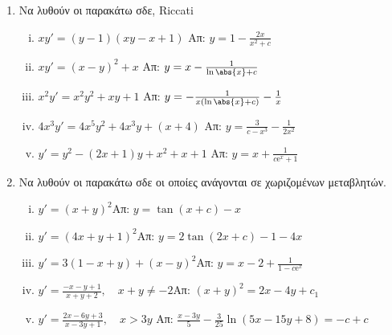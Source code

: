 \begin{enumerate}
  \item Να λυθούν οι παρακάτω σδε, Riccati
    \begin{enumerate}[i)]
      \item $xy'=(y-1)(xy-x+1)$ \hfill Απ: $y=1-\frac{2x}{x^2+c}$
      \item $xy'=(x-y)^2+x$ \hfill Απ: $y=x-\frac{1}{\ln\abs{x}+c}$
      \item $x^2y'=x^2y^2+xy+1$ \hfill Απ: $y=-\frac{1}{x(\ln\abs{x}+c)}-\frac{1}{x}$
      \item $4x^3y'=4x^5y^2+4x^3y+(x+4)$ \hfill Απ: $y=\frac{3}{c-x^3}-\frac{1}{2x^2}$
      \item $y'=y^2-(2x+1)y+x^2+x+1$ \hfill Απ: $y=x+\frac{1}{c \mathrm{e}^x+1}$
    \end{enumerate}

  \item Να λυθούν οι παρακάτω σδε οι οποίες ανάγονται σε χωριζομένων μεταβλητών.

    \begin{enumerate}[i)]
      \item $y'=(x+y)^2$\hfill Απ: $y=\tan (x+c)-x$
      \item $y'=(4x+y+1)^2$\hfill Απ: $y=2\tan(2x+c)-1-4x$
      \item $y'=3(1-x+y)+(x-y)^2$\hfill Απ: $y=x-2+\frac{1}{1-c \mathrm{e}^x}$
      \item $y'=\frac{-x-y+1}{x+y+2}, \quad x+y\neq -2$\hfill Απ: $(x+y)^2=2x-4y+c_1$
      \item $y'=\frac{2x-6y+3}{x-3y+1}, \quad x>3y$
        \hfill Απ: $\frac{x-3y}{5}-\frac{3}{25}\ln(5x-15y+8)=-c+c$
    \end{enumerate}
\end{enumerate}



